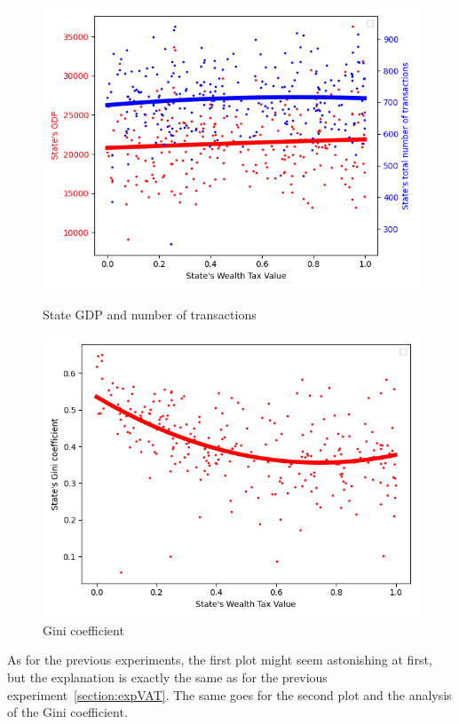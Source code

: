 {{        \begin{figure}[H]
                \includegraphics[width=\linewidth]{img/exp/5_1.png}
                \caption{State GDP and number of transactions}
            \endminipage\hfill
                \includegraphics[width=\linewidth]{img/exp/5_3.png}
                \caption{Gini coefficient}
            \endminipage\hfill
        \end{figure}

        As for the previous experiments, the first plot might seem astonishing at first, but the explanation is exactly the same as for the previous experiment~\ref{section:expVAT}. The same goes for the second plot and the analysis of the Gini coefficient.


}}
